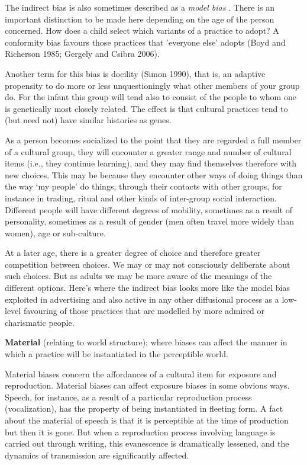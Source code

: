 The indirect bias is also sometimes described as a \textit{model bias}
. There is an important distinction to be made here depending on the age 
of the person concerned. How does a child select which variants of a 
practice to adopt? A conformity bias favours those practices that 
'everyone else' adopts (Boyd and Richerson 1985; Gergely and Csibra 
2006). 



Another term for this bias is docility (Simon 1990), that is, an 
adaptive propensity to do more or less unquestioningly what other 
members of your group do. For the infant this group will tend also to 
consist of the people to whom one is genetically most closely related. 
The effect is that cultural practices tend to (but need not) have 
similar histories as genes. 



As a person becomes socialized to the point that they are regarded a 
full member of a cultural group, they will encounter a greater range and 
number of cultural items (i.e., they continue learning), and they may 
find themselves therefore with new choices. This may be because they 
encounter other ways of doing things than the way \textquoteleft my people' do things, 
through their contacts with other groups, for instance in trading, 
ritual and other kinds of inter-group social interaction. Different 
people will have different degrees of mobility, sometimes as a result of 
personality, sometimes as a result of gender (men often travel more 
widely than women), age or sub-culture. 



At a later age, there is a greater degree of choice and therefore 
greater competition between choices. We may or may not consciously 
deliberate about such choices. But as adults we may be more aware of the 
meanings of the different options. Here's where the indirect bias looks 
more like the model bias exploited in advertising and also active in any 
other diffusional process as a low-level favouring of those practices 
that are modelled by more admired or charismatic people.



\textbf{Material} (relating to world structure); where biases can 
affect the manner in which a practice will be instantiated in the 
perceptible world. 



Material biases concern the affordances of a cultural item for exposure 
and reproduction. Material biases can affect exposure biases in some 
obvious ways. Speech, for instance, as a result of a particular 
reproduction process (vocalization), has the property of being 
instantiated in fleeting form. A fact about the material of speech is 
that it is perceptible at the time of production but then it is gone. 
But when a reproduction process involving language is carried out 
through writing, this evanescence is dramatically lessened, and the 
dynamics of transmission are significantly affected. 



